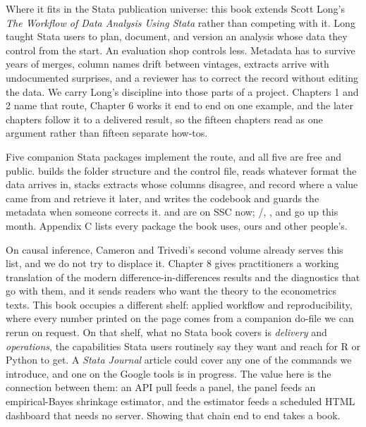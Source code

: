 \documentclass[11pt]{article}
\begin{document}
Where it fits in the Stata publication universe: this book extends Scott Long's \textit{The Workflow of Data Analysis Using Stata} rather than competing with it. Long taught Stata users to plan, document, and version an analysis whose data they control from the start. An evaluation shop controls less. Metadata has to survive years of merges, column names drift between vintages, extracts arrive with undocumented surprises, and a reviewer has to correct the record without editing the data. We carry Long's discipline into those parts of a project. Chapters 1 and 2 name that route, Chapter 6 works it end to end on one example, and the later chapters follow it to a delivered result, so the fifteen chapters read as one argument rather than fifteen separate how-tos.

Five companion Stata packages implement the route, and all five are free and public.  builds the folder structure and the control file,  reads whatever format the data arrives in,  stacks extracts whose columns disagree,  and  record where a value came from and retrieve it later, and  writes the codebook and guards the metadata when someone corrects it.  and  are on SSC now; /, , and  go up this month. Appendix C lists every package the book uses, ours and other people's.

On causal inference, Cameron and Trivedi's second volume already serves this list, and we do not try to displace it. Chapter 8 gives practitioners a working translation of the modern difference-in-differences results and the diagnostics that go with them, and it sends readers who want the theory to the econometrics texts. This book occupies a different shelf: applied workflow and reproducibility, where every number printed on the page comes from a companion do-file we can rerun on request. On that shelf, what no Stata book covers is \textit{delivery} and \textit{operations}, the capabilities Stata users routinely say they want and reach for R or Python to get. A \textit{Stata Journal} article could cover any one of the commands we introduce, and one on the Google tools is in progress. The value here is the connection between them: an API pull feeds a panel, the panel feeds an empirical-Bayes shrinkage estimator, and the estimator feeds a scheduled HTML dashboard that needs no server. Showing that chain end to end takes a book.
\end{document}
